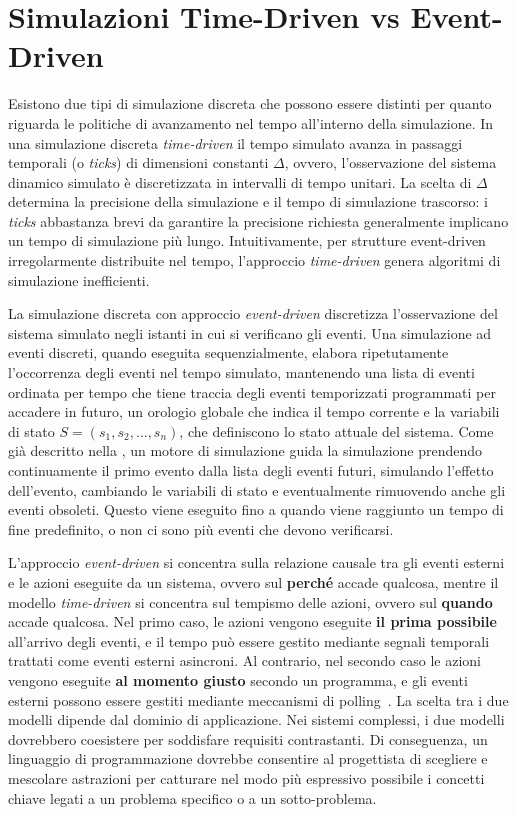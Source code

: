 \documentclass[12pt,a4paper,openright,twoside]{book}
\begin{document}
\section{Simulazioni Time-Driven vs Event-Driven}
Esistono due tipi di simulazione discreta che possono essere distinti per quanto riguarda le politiche di avanzamento nel tempo all'interno della simulazione. In una simulazione discreta \textit{time-driven} il tempo simulato avanza in passaggi temporali (o \textit{ticks}) di dimensioni constanti $\Delta$, ovvero, l'osservazione del sistema dinamico simulato è discretizzata in intervalli di tempo unitari. La scelta di $\Delta$ determina la precisione della simulazione e il tempo di simulazione trascorso: i \textit{ticks} abbastanza brevi da garantire la precisione richiesta generalmente implicano un tempo di simulazione più lungo. Intuitivamente, per strutture event-driven irregolarmente distribuite nel tempo, l'approccio \textit{time-driven} genera algoritmi di simulazione inefficienti. 

La simulazione discreta con approccio \textit{event-driven} discretizza l'osservazione del sistema simulato negli istanti in cui si verificano gli eventi. Una simulazione ad eventi discreti, quando eseguita sequenzialmente, elabora ripetutamente l'occorrenza degli eventi nel tempo simulato, mantenendo una lista di eventi ordinata per tempo che tiene traccia degli eventi temporizzati programmati per accadere in futuro, un orologio globale che indica il tempo corrente e la variabili di stato $S = (s_1, s_2, \dots, s_n)$, che definiscono lo stato attuale del sistema. Come già descritto nella , un motore di simulazione guida la simulazione prendendo continuamente il primo evento dalla lista degli eventi futuri, simulando l'effetto dell'evento, cambiando le variabili di stato e eventualmente rimuovendo anche gli eventi obsoleti. Questo viene eseguito fino a quando viene raggiunto un tempo di fine predefinito, o non ci sono più eventi che devono verificarsi.

L'approccio \textit{event-driven} si concentra sulla relazione causale tra gli eventi esterni e le azioni eseguite da un sistema, ovvero sul \textbf{perché} accade qualcosa, mentre il modello \textit{time-driven} si concentra sul tempismo delle azioni, ovvero sul \textbf{quando} accade qualcosa. Nel primo caso, le azioni vengono eseguite \textbf{il prima possibile} all'arrivo degli eventi, e il tempo può essere gestito mediante segnali temporali trattati come eventi esterni asincroni. Al contrario, nel secondo caso le azioni vengono eseguite \textbf{al momento giusto} secondo un programma, e gli eventi esterni possono essere gestiti mediante meccanismi di polling~\cite{TISATO199531}.
La scelta tra i due modelli dipende dal dominio di applicazione. Nei sistemi complessi, i due modelli dovrebbero coesistere per soddisfare requisiti contrastanti. Di conseguenza, un linguaggio di programmazione dovrebbe consentire al progettista di scegliere e mescolare astrazioni per catturare nel modo più espressivo possibile i concetti chiave legati a un problema specifico o a un sotto-problema. 
\end{document}
